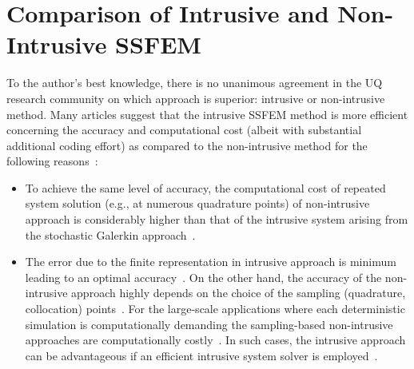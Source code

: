 \documentclass[letter,1p,11pt,oneside,onecolumn,sort&compress]{elsarticle}
\begin{document}
\section{Comparison of Intrusive and Non-Intrusive SSFEM} \label{sec:inVni}
To the author's  best knowledge, there is no unanimous agreement in the UQ research community on which approach is superior: intrusive or non-intrusive method. Many articles suggest that the intrusive SSFEM method is more efficient concerning the accuracy and computational cost (albeit with substantial additional coding effort) as compared to the non-intrusive method for the following reasons~\cite{elman2011assessment,tipireddy2010comparison,stefanou2009stochastic,xiuNMSC2010,giraldi2014or}:
\begin{itemize}
\item To achieve the same level of accuracy, the computational cost of repeated system solution (e.g., at numerous quadrature points) of non-intrusive approach is considerably higher than that of the intrusive system arising from the stochastic Galerkin approach~\cite{elman2011assessment}.
\item The error due to the finite representation in intrusive approach is minimum leading to an optimal accuracy~\cite{ghanemSFEM1991}.
On the other hand,
the accuracy of the non-intrusive approach highly depends on the choice of the sampling (quadrature, collocation) points~\cite{le2010spectral,xiuNMSC2010,back2011stochastic,eldred2009recent}.
For the large-scale applications where each deterministic simulation is computationally demanding the sampling-based non-intrusive approaches are computationally costly~\cite{elman2011assessment}. In such cases, the intrusive approach can be advantageous if an efficient intrusive system solver is employed~\cite{elman2011assessment}.
\end{itemize}
\end{document}

